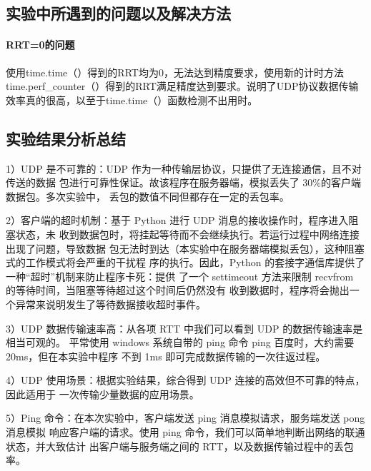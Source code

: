 \documentclass[a4paper,12pt]{report}
\begin{document}
\begin{spacing}{1.5}
\subsection{实验中所遇到的问题以及解决方法}
\paragraph*{RRT=0的问题} 使用time.time（）得到的RRT均为0，无法达到精度要求，使用新的计时方法time.perf\_counter（）得到的RRT满足精度达到要求。说明了UDP协议数据传输效率真的很高，以至于time.time（）函数检测不出用时。

\subsection{实验结果分析总结}

1）UDP 是不可靠的：UDP 作为一种传输层协议，只提供了无连接通信，且不对传送的数据 包进行可靠性保证。故该程序在服务器端，模拟丢失了 30\%的客户端数据包。多次实验中， 丢包的数值不同但都存在一定的丢包率。 

2）客户端的超时机制：基于 Python 进行 UDP 消息的接收操作时，程序进入阻塞状态，未 收到数据包时，将挂起等待而不会继续执行。若运行过程中网络连接出现了问题，导致数据 包无法ࣿ时到达（本实验中在服务器端模拟丢包），这种阻塞式的工作模式将会严重的干扰程 序的执行。因此，Python 的套接字通信库提供了一种“超时”机制来防止程序卡死：提供 了一个 settimeout 方法来限制 recvfrom 的等待时间，当阻塞等待超过这个时间后仍然没有 收到数据时，程序将会抛出一个异常来说明发生了等待数据接收超时事件。 

3）UDP 数据传输速率高：从各项 RTT 中我们可以看到 UDP 的数据传输速率是相当可观的。 平常使用 windows 系统自带的 ping 命令 ping 百度时，大约需要 20ms，但在本实验中程序 不到 1ms 即可完成数据传输的一次往返过程。

4）UDP 使用场景：根据实验结果，综合得到 UDP 连接的高效但不可靠的特点，因此适用于 一次传输少量数据的应用场景。 

5）Ping 命令：在本次实验中，客户端发送 ping 消息模拟请求，服务端发送 pong 消息模拟 响应客户端的请求。使用 ping 命令，我们可以简单地判断出网络的联通状态，并大致估计 出客户端与服务端之间的 RTT，以及数据传输过程中的丢包率。



\end{spacing}
\end{document}
